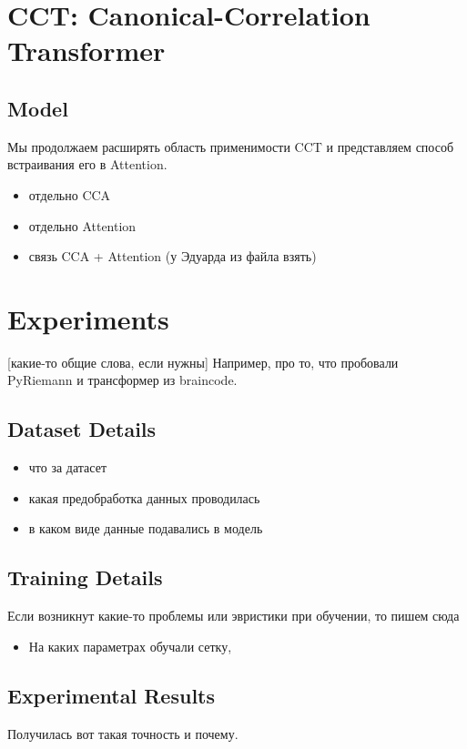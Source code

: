 \documentclass[a4paper,14pt]{article}
\theoremstyle{plain} %
\theoremstyle{definition} %
\theoremstyle{remark} %
\begin{document}
    
        \section{CCT: Canonical-Correlation Transformer}
        \subsection{Model}
        Мы продолжаем расширять область применимости CCT и представляем способ встраивания его в Attention.
        \begin{itemize}
            \item отдельно CCA
            \item отдельно Attention
            \item связь CCA + Attention (у Эдуарда из файла взять)
        \end{itemize}


        \section{Experiments}
        [какие-то общие слова, если нужны] Например, про то, что пробовали PyRiemann и трансформер из braincode.
        \subsection{Dataset Details}
        \begin{itemize}
            \item что за датасет
            \item какая предобработка данных проводилась
            \item в каком виде данные подавались в модель
        \end{itemize}
        
        \subsection{Training Details}
        Если возникнут какие-то проблемы или эвристики при обучении, то пишем сюда
        \begin{itemize}
            \item На каких параметрах обучали сетку, 
        \end{itemize}

        \subsection{Experimental Results}
        Получилась вот такая точность и почему.
        
	\nocite{*}
        
	
\end{document}
